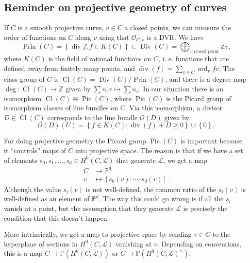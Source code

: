 \subsection{Reminder on projective geometry of curves}
If \( C \) is a smooth projective curve, \( v \in C \) a closed points, we can measure the order of functions on \( C \) along \( v \) using that \( \mathcal{O}_{C,v} \) is a DVR.
We have
\[ \operatorname{Prin}(C) = \left\lbrace \operatorname{div} f , f \in K(C) \right\rbrace \subset \operatorname{Div}(C) = \bigoplus_{v \text{ closed point}} \mathbb{Z}v,  \]
where \( K(C) \) is the field of rational functions on \( C \), i. e. functions that are defined away from finitely many points, and \( \operatorname{div}(f) = \sum_{v \in C} \operatorname{ord}_vf v \).
The class group of \( C \) is \( \operatorname{Cl}(C) = \operatorname{Div}(C) / \operatorname{Prin}(C) \), and there is a degree map
\( \operatorname{deg} \colon \operatorname{Cl}(C) \to \mathbb{Z} \) given by \( \sum n_v v \mapsto \sum n_v  \).
In our situation there is an isomorphism \( \operatorname{Cl}(C) \cong \operatorname{Pic}(C) \), where \( \operatorname{Pic}(C) \) is the Picard group of isomorphism classes of line bundles on \( C \).
Via this isomorphism, a divisor \( D \in \operatorname{Cl}(C) \) corresponds to the line bundle \( \mathcal{O}(D) \) given by
\[ \mathcal{O}(D) (U) = \left\lbrace f \in K(C) : \operatorname{div}(f) + D \geq 0 \right\rbrace \cup \left\lbrace 0 \right\rbrace . \]

For doing projective geometry the Picard group \( \operatorname{Pic}(C) \) is important because it ``controls'' maps of \( C \) into projective space.
The reason is that if we have a set of elements \( s_0,s_1,\dots,s_d \in H^0 \left( C,\mathcal{L} \right) \) that generate \( \mathcal{L} \), we get a map
\begin{align*}
  C & \to \mathbb{P}^d \\
  v & \mapsto \left[ s_0(v) : \cdots : s_d(v) \right] .
\end{align*}
Although the value \( s_i(v) \) is not well-defined, the common ratio of the \( s_i(v) \) is well-defined as an element of \( \mathbb{P}^d \).
The way this could go wrong is if all the \( s_i \) vanish at a point, but the assumption that they generate \( \mathcal{L} \) is precisely the condition that this doesn't happen.
\begin{remark}
  More intrinsically, we get a map to projective space by sending \( v \in C \) to the hyperplane of sections in \( H^0 \left( C,\mathcal{L} \right) \) vanishing at \( v \). Depending on conventions, this is a map \( C \to \mathbb{P} \left( H^0 \left( C, \mathcal{L} \right) \right) \) or \( C \to \mathbb{P} \left( H^0 \left( C, \mathcal{L} \right)^\vee \right) \).
\end{remark}

